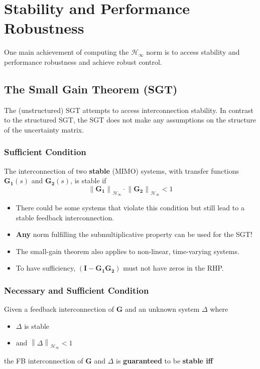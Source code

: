 \section{Stability and Performance Robustness}
One main achievement of computing the $\mathcal{H}_\infty$ norm is to access stability and performance robustness and achieve robust control.
\subsection{The Small Gain Theorem (SGT)}
The (unstructured) SGT attempts to access interconnection stability. In contrast to the structured SGT, the SGT does not make any assumptions on the structure of the uncertainty matrix.

\subsubsection{Sufficient Condition}

The interconnection of two \textbf{stable} (MIMO) systems, with transfer functions $\mathbf{G_1}(s)$ and $\mathbf{G_2}(s)$, is stable if
\begin{equation*}
    \left\|\mathbf{G_1}\right\|_{\mathcal{H}_\infty}\cdot\left\|\mathbf{G_2}\right\|_{\mathcal{H}_\infty}<1
\end{equation*}

\begin{itemize}
    \item There could be some systems that violate this condition but still lead to a stable feedback interconnection.
    \item \textbf{Any} norm fulfilling the submultiplicative property can be used for the SGT!
    \item The small-gain theorem also applies to non-linear, time-varying systems.
    \item To have sufficiency, $(\mathbf{I}-\mathbf{G_1G_2})$ must not have zeros in the RHP.
\end{itemize}

\subsubsection{Necessary and Sufficient Condition}
Given a feedback interconnection of $\mathbf{G}$ and an unknown system $\Delta$ where
\begin{itemize}
    \item $\Delta$ is stable
    \item and $\left\|\Delta\right\|_{\mathcal{H}_\infty}<1$
\end{itemize}
the FB interconnection of $\mathbf{G}$ and $\Delta$ is \textbf{guaranteed} to be \textbf{stable iff}

